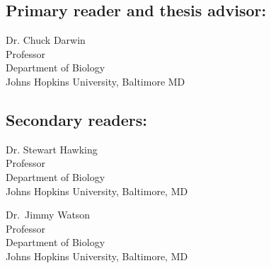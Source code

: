 
\Blindtext[3]


\begin{singlespace}

\subsection*{Primary reader and thesis advisor:}

Dr. Chuck Darwin \\
Professor\\
Department of Biology\\
Johns Hopkins University, Baltimore MD 

\vspace{0.25in}

\subsection*{Secondary readers: }

Dr. Stewart Hawking\\
Professor\\
Department of Biology \\
Johns Hopkins University, Baltimore, MD 

\vspace{0.1in}

Dr.~Jimmy Watson \\
Professor\\
Department of Biology \\
Johns Hopkins University, Baltimore, MD 


\end{singlespace}